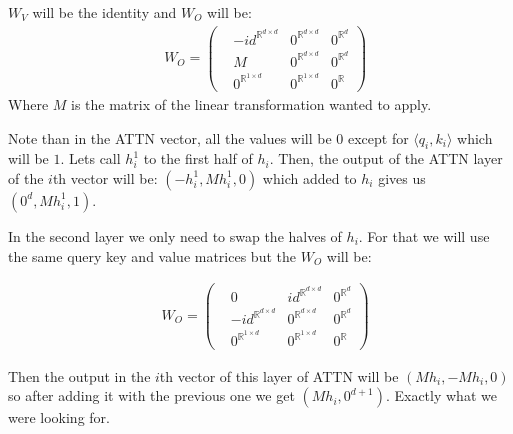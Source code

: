 $W_V$ will be the identity and $W_O$ will be:
\begin{align*}
    & W_O = \left(\begin{matrix}
    &-id^{\mathbb{R}^{d\times d}}     &0^{\mathbb{R}^{d\times d}}     &0^{\mathbb{R}^d} \\
    &M                                &0^{\mathbb{R}^{d\times d}}     &0^{\mathbb{R}^d} \\
    &0^{\mathbb{R}^{1\times d}}       &0^{\mathbb{R}^{1\times d}}     &0^{\mathbb{R}}
\end{matrix}\right)
\end{align*}
Where $M$ is the matrix of the linear transformation wanted to apply.


Note than in the ATTN vector, all the values will be $0$ except for $\langle q_i, k_i\rangle$ which will be $1$. Lets call $h_i^1$ to the first half of $h_i$. Then, the output of the ATTN layer of the $i$th vector will be: $(-h^1_i, Mh^1_i, 0)$ which added to $h_i$ gives us $(0^d, Mh^1_i, 1)$.

In the second layer we only need to swap the halves of $h_i$. For that we will use the same query key and value matrices but the $W_O$ will be:

\begin{align*}
    & W_O = \left(\begin{matrix}
    &0                                &id^{\mathbb{R}^{d\times d}}     &0^{\mathbb{R}^d} \\
    &-id^{\mathbb{R}^{d\times d}}      &0^{\mathbb{R}^{d\times d}}     &0^{\mathbb{R}^d} \\
    &0^{\mathbb{R}^{1\times d}}       &0^{\mathbb{R}^{1\times d}}     &0^{\mathbb{R}}
\end{matrix}\right)
\end{align*}

Then the output in the $i$th vector of this layer of ATTN will be $(M h_i, -M h_i, 0)$ so after adding it with the previous one we get $(M h_i, 0^{d+1})$. Exactly what we were looking for.